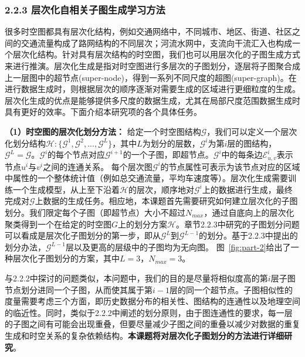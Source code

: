 \documentclass[12pt,UTF8,AutoFakeBold=2,a4paper]{ctexart} %
\begin{document}
\subsubsection{2.2.3 层次化自相关子图生成学习方法}

很多时空图都具有层次化结构，例如交通网络中，不同城市、地区、街道、社区之间的交通流量构成了路网结构的不同层次；河流水网中，支流向干流汇入也构成一个层次化结构。针对具有层次结构的时空图，我们也可以用层次化的子图生成方式来进行推演。层次化生成是指对时空图进行多层次的子图划分，逐层将子图聚合成上一层图中的超节点(super-node)，得到一系列不同尺度的超图(super-graph)。在进行数据生成时，则根据层次的顺序逐渐对需要生成的区域进行更细粒度的生成。层次化生成的优点是能够提供多尺度的数据生成，尤其在局部尺度范围数据生成时具有更好的效率。下面介绍本研究项的各个具体任务。%

\textbf{（1）时空图的层次化划分方法：} 给定一个时空图结构$\mathcal{G}$，我们可以定义一个层次化划分结构$\mathcal{H}:\{\mathcal{G}^1,\mathcal{G}^2,...,\mathcal{G}^L \}$，其中$L$为划分的层数，$\mathcal{G}^i$为第$i$层的图结构，$\mathcal{G}^L = \mathcal{G}$。$\mathcal{G}^i$的每个节点对应$\mathcal{G}^{i+1}$的一个子图，即超节点。$\mathcal{G}^i$中的每条边$\mathcal{E}^i_{u,v}$表示节点$u^i$与$v^i$之间的连通关系。%
每个层次图$\mathcal{G}^i$的节点属性可表示为该节点对应的区域中属性的一个整体统计值（例如总交通流量，平均车速度等）。层次化生成需要训练一个生成模型，从上至下沿着$\mathcal{H}$的层次，顺序地对$\mathcal{G}^i$上的数据进行生成，最终完成对$\mathcal{G}$上数据的生成任务。相应地，本课题首先需要研究如何建立层次化的子图划分。我们限定每个子图（即超节点）大小不超过$N_{max}$，通过自底向上的层次化聚类得到一个在给定的时空图$G$上的划分方案$\mathcal{H}$。章节2.2.3中研究的子图划分问题可以看成是层次化子图划分的第一步，即从$\mathcal{G}^L$到$\mathcal{G}^{L-1}$的划分。基于2.2.3中提出的划分办法，$\mathcal{G}^{L-1}$层以及更高的层级中的子图均为无向图。%
图~\ref{fig:part-2}给出了一种层次化子图划分的方案，其中$L=3$，$N_{max} = 3$。

与2.2.2中探讨的问题类似，本问题中，我们的目的是尽量将相似度高的第$i$层子图节点划分进同一个子图，从而使其属于第$i-1$层的同一个超节点。子图相似性的度量需要考虑三个方面，即历史数据分布的相关性、图结构的连通性以及地理空间的临近性。同时，类似于2.2.2中阐述的划分原则，由于图连通性的要求，每一层的子图之间有可能会出现重叠，但要尽量减少子图之间的重叠以减少对数据的重复生成和时空关系的复杂依赖结构。\textbf{本课题将对层次化子图划分的方法进行详细研究}。
\end{document}
